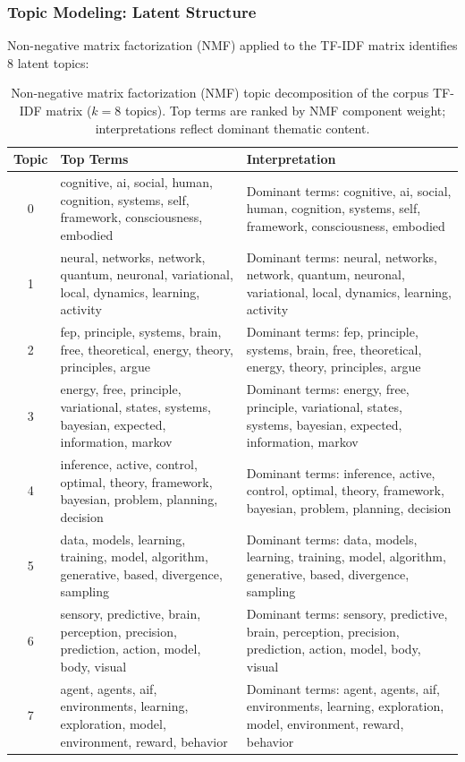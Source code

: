 \documentclass[
  english,
]{article}
\begin{document}
\subsubsection{Topic Modeling: Latent
Structure}\label{topic-modeling-latent-structure}

Non-negative matrix factorization (NMF) applied to the TF-IDF matrix
identifies 8 latent topics:

\begin{table}[htbp]
\centering
\caption{Non-negative matrix factorization (NMF) topic decomposition of the corpus TF-IDF matrix ($k = 8$ topics). Top terms are ranked by NMF component weight; interpretations reflect dominant thematic content.}
\label{tab:nmf_topics}
\begin{tabular}{clp{6cm}}
\toprule
\textbf{Topic} & \textbf{Top Terms} & \textbf{Interpretation} \\
\midrule
0 & cognitive, ai, social, human, cognition, systems, self, framework, consciousness, embodied & Dominant terms: cognitive, ai, social, human, cognition, systems, self, framework, consciousness, embodied \\
1 & neural, networks, network, quantum, neuronal, variational, local, dynamics, learning, activity & Dominant terms: neural, networks, network, quantum, neuronal, variational, local, dynamics, learning, activity \\
2 & fep, principle, systems, brain, free, theoretical, energy, theory, principles, argue & Dominant terms: fep, principle, systems, brain, free, theoretical, energy, theory, principles, argue \\
3 & energy, free, principle, variational, states, systems, bayesian, expected, information, markov & Dominant terms: energy, free, principle, variational, states, systems, bayesian, expected, information, markov \\
4 & inference, active, control, optimal, theory, framework, bayesian, problem, planning, decision & Dominant terms: inference, active, control, optimal, theory, framework, bayesian, problem, planning, decision \\
5 & data, models, learning, training, model, algorithm, generative, based, divergence, sampling & Dominant terms: data, models, learning, training, model, algorithm, generative, based, divergence, sampling \\
6 & sensory, predictive, brain, perception, precision, prediction, action, model, body, visual & Dominant terms: sensory, predictive, brain, perception, precision, prediction, action, model, body, visual \\
7 & agent, agents, aif, environments, learning, exploration, model, environment, reward, behavior & Dominant terms: agent, agents, aif, environments, learning, exploration, model, environment, reward, behavior \\
\bottomrule
\end{tabular}
\end{table}
\end{document}
